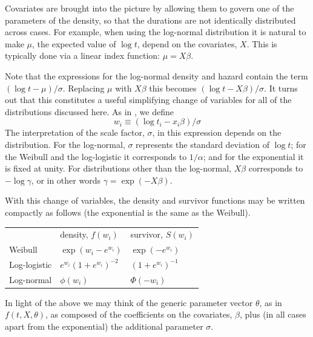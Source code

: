 Covariates are brought into the picture by allowing them to govern one
of the parameters of the density, so that the durations are not
identically distributed across cases.  For example, when using the
log-normal distribution it is natural to make $\mu$, the expected
value of $\log t$, depend on the covariates, $X$.  This is typically
done via a linear index function: $\mu = X\beta$.

Note that the expressions for the log-normal density and hazard
contain the term $(\log t - \mu)/\sigma$.  Replacing $\mu$ with
$X\beta$ this becomes $(\log t - X\beta)/\sigma$.  It turns out that
this constitutes a useful simplifying change of variables for all of
the distributions discussed here. As in \cite{kalbfleisch02}, we
define
\[
w_i \equiv (\log t_i - x_i\beta)/\sigma
\]
The interpretation of the scale factor, $\sigma$, in this expression
depends on the distribution. For the log-normal, $\sigma$ represents
the standard deviation of $\log t$; for the Weibull and the
log-logistic it corresponds to $1/\alpha$; and for the exponential it
is fixed at unity. For distributions other than the log-normal,
$X\beta$ corresponds to $-\log \gamma$, or in other words $\gamma =
\exp(-X\beta)$.

With this change of variables, the density and survivor functions may
be written compactly as follows (the exponential is the same as the
Weibull).

\begin{center}
\setlength\tabcolsep{1.5em}
\begin{tabular}{lll}
 & density, $f(w_i)$ & survivor, $S(w_i)$ \\ [4pt]
Weibull & 
$\exp\left(w_i - e^{w_i}\right)$ & $\exp(-e^{w_i})$
\\ [4pt]
Log-logistic & 
$e^{w_i} \left(1 + e^{w_i}\right)^{-2}$ 
& $\left(1 + e^{w_i}\right)^{-1}$ \\ [1ex]
Log-normal & $\phi(w_i)$ & $\Phi(-w_i)$
\end{tabular}
\end{center}

In light of the above we may think of the generic parameter vector
$\theta$, as in $f(t, X, \theta)$, as composed of the coefficients on
the covariates, $\beta$, plus (in all cases apart from the exponential)
the additional parameter $\sigma$.

